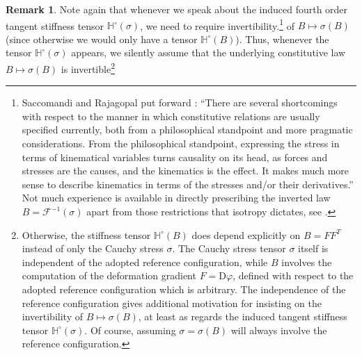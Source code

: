 \documentclass[10pt]{article}
\newcounter{theoremCounter}
\numberwithin{theoremCounter}{section}
\theoremstyle{plain}
\theoremstyle{definition}
\newtheorem{rem}[theoremCounter]{Remark}
\newcommand{\DD}{\mathrm{D}}
\def\H{\mathbb{H}}
\numberwithin{equation}{section}
\begin{document}
%
%
%
%
%
\begin{rem}
Note again that whenever we speak about the induced fourth order tangent stiffness tensor $\H^{\circ}(\sigma)$, we need to require invertibility.\footnote
{
Saccomandi and Rajagopal put forward \cite{saccomandi2016novel}: ``There are several shortcomings with respect to the manner in which constitutive relations are usually specified currently, both from a philosophical standpoint and more pragmatic considerations. From the philosophical standpoint, expressing the stress in terms of kinematical variables turns causality on its head, as forces and stresses are the causes, and the kinematics is the effect. It makes much more sense to describe kinematics in terms of the stresses and/or their derivatives.'' Not much experience is available in directly prescribing the inverted law $B=\mathcal{F}^{-1}(\sigma)$ apart from those restrictions that isotropy dictates, see \cite{rajagopal2003implicit, rajagopal2007elasticity, sfyris2015treatment}.
 }
of $B \mapsto \sigma(B)$ (since otherwise we would only have a tensor $\H^{\circ}(B)$). Thus, whenever the tensor $\H^{\circ}(\sigma)$ appears, we silently assume that the underlying constitutive law $B \mapsto \sigma(B)$ is invertible\footnote
{
Otherwise, the stiffness tensor $\H^{\circ}(B)$ does depend explicitly on $B = F F^T$ instead of only the Cauchy stress $\sigma$. The Cauchy stress tensor $\sigma$ itself is independent of the adopted reference configuration, while $B$ involves the computation of the deformation gradient $F = \DD \varphi$, defined with respect to the adopted reference configuration which is arbitrary. The independence of the reference configuration gives additional motivation for insisting on the invertibility of $B \mapsto \sigma(B)$, at least as regards the induced tangent stiffness tensor $\H^{\circ}(\sigma)$. Of course, assuming $\sigma = \sigma(B)$ will always involve the reference configuration.
}
\end{rem}
%
\end{document}
